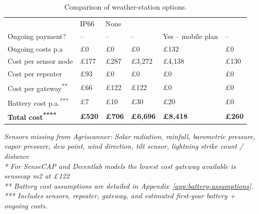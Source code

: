 \begin{table}[H]
\begin{tabularx}{\textwidth}{l >{\raggedright\arraybackslash}X
      >{\raggedright\arraybackslash}X >{\raggedright\arraybackslash}X
      >{\raggedright\arraybackslash}X >{\raggedright\arraybackslash}X}
                                                    & IP66                  &
                                                    None     \\
    Ongoing payment?                                & -- & --
    & --                                              & Yes -- mobile plan
    & -- \\
    Ongoing costs p.a                               & \pounds{}0 & \pounds{}0 &
                                                    \pounds{}0 & \pounds{}132 &
                                                    \pounds{}0 \\
    Cost per sensor node                            & \pounds{}177 &
    \pounds{}287                                    & \pounds{}3{,}272 &
    \pounds{}4{,}138                                & \pounds{}130 \\
    Cost per repeater                               & \pounds{}93 & \pounds{}0 &
                                                    \pounds{}0 & \pounds{}0 &
                                                    \pounds{}0 \\
    Cost per gateway\textsuperscript{**}            & \pounds{}66 & \pounds{}122
                                                    & \pounds{}122 & \pounds{}0
                                                    & \pounds{}0 \\
    Battery cost p.a.\textsuperscript{***}          & \pounds{}7 & \pounds{}10 &
                                                    \pounds{}30 & \pounds{}20 &
                                                    \pounds{}0 \\
    \textbf{Total cost\textsuperscript{****}}       & \textbf{\pounds{}520} &
    \textbf{\pounds{}706}                           & \textbf{\pounds{}6{,}696}
    & \textbf{\pounds{}8{,}418} & \textbf{\pounds{}260} \\
    \hline
  \end{tabularx}

  \vspace{0.25em}
  \textit{\footnotesize * Sensors missing from Agriscanner: Solar radiation,
    rainfall, barometric pressure, vapor pressure, dew point, wind direction,
    tilt sensor, lightning strike count / distance} \\
  \textit{\footnotesize ** For SenseCAP and Decentlab models the lowest cost
    gateway available is sensecap m2 at £122} \\
  \textit{\footnotesize *** Battery cost assumptions are detailed in
    Appendix~\ref{app:battery-assumptions}.} \\
  \textit{\footnotesize **** Includes sensors, repeater, gateway, and estimated first-year battery + ongoing costs.}
  \caption{Comparison of weather-station options.}
  \label{tab:commercial-comparison}
\end{table}

